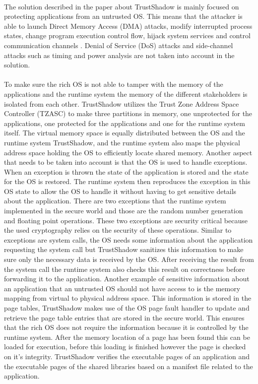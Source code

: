 \paragraph*{}
The solution described in the paper about TrustShadow is mainly focused on protecting applications from an untrusted OS. This means that the attacker is able to launch Direct Memory Access (DMA) attacks, modify interrupted process states, change program execution control flow, hijack system services and control communication channels \cite{QiangChenyi2018CCAD}. Denial of Service (DoS) attacks and side-channel attacks such as timing and power analysis are not taken into account in the solution.

\paragraph*{}
To make sure the rich OS is not able to tamper with the memory of the applications and the runtime system the memory of the different stakeholders is isolated from each other. TrustShadow utilizes the Trust Zone Address Space Controller (TZASC) to make three partitions in memory, one unprotected for the applications, one protected for the applications and one for the runtime system itself. The virtual memory space is equally distributed between the OS and the runtime system TrustShadow, and the runtime system also maps the physical address space holding the OS to efficiently locate shared memory. Another aspect that needs to be taken into account is that the OS is used to handle exceptions. When an exception is thrown the state of the application is stored and the state for the OS is restored. The runtime system then reproduces the exception in this OS state to allow the OS to handle it without having to get sensitive details about the application. There are two exceptions that the runtime system implemented in the secure world and those are the random number generation and floating point operations. These two exceptions are security critical because the used cryptography relies on the security of these operations. Similar to exceptions are system calls, the OS needs some information about the application requesting the system call but TrustShadow sanitizes this information to make sure only the necessary data is received by the OS. After receiving the result from the system call the runtime system also checks this result on correctness before forwarding it to the application. Another example of sensitive information about an application that an untrusted OS should not have access to is the memory mapping from virtual to physical address space. This information is stored in the page tables, TrustShadow makes use of the OS page fault handler to update and retrieve the page table entries that are stored in the secure world. This ensures that the rich OS does not require the information because it is controlled by the runtime system. After the memory location of a page has been found this can be loaded for execution, before this loading is finished however the page is checked on it's integrity. TrustShadow verifies the executable pages of an application and the executable pages of the shared libraries based on a manifest file related to the application. 

